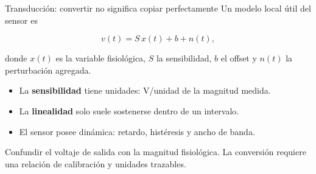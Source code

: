 \documentclass[
  ignorenonframetext,
  aspectratio=169,
  spanish,
  professionalfonts]{beamer}
\providecommand{\tightlist}{%
  \setlength{\itemsep}{0pt}\setlength{\parskip}{0pt}}
\begin{document}
\begin{frame}{Transducción: convertir no significa copiar perfectamente}
\protect{}\label{transducciuxf3n-convertir-no-significa-copiar-perfectamente}
Un modelo local útil del sensor es

\[
v(t)=S\,x(t)+b+n(t),
\]

donde \(x(t)\) es la variable fisiológica, \(S\) la sensibilidad, \(b\)
el offset y \(n(t)\) la perturbación agregada.

\begin{itemize}
\tightlist
\item
  La \textbf{sensibilidad} tiene unidades: V/unidad de la magnitud
  medida.
\item
  La \textbf{linealidad} solo suele sostenerse dentro de un intervalo.
\item
  El sensor posee dinámica: retardo, histéresis y ancho de banda.
\end{itemize}

\begin{tcolorbox}[enhanced jigsaw, arc=.35mm, bottomrule=.15mm, bottomtitle=1mm, breakable, colback=white, colbacktitle=quarto-callout-warning-color!10!white, colframe=quarto-callout-warning-color-frame, coltitle=black, left=2mm, leftrule=.75mm, opacityback=0, opacitybacktitle=0.6, rightrule=.15mm, title={Error frecuente}, titlerule=0mm, toprule=.15mm, toptitle=1mm]

Confundir el voltaje de salida con la magnitud fisiológica. La
conversión requiere una relación de calibración y unidades trazables.

\end{tcolorbox}
\end{frame}
\end{document}
